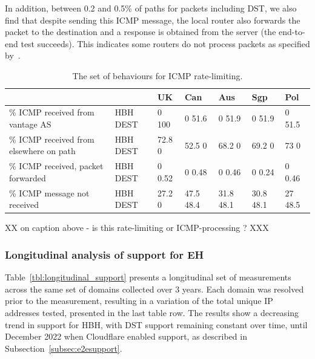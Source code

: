 \documentclass[conference]{IEEEtran}
\begin{document}
In addition, between 0.2 and 0.5\% of paths for packets including DST, we also find that despite sending this ICMP message, the local router also forwards the packet to the destination and a response is  obtained from the server (the end-to-end test succeeds). This indicates some routers do not process packets as specified by~\cite{RFC8200}.

\begin{table}
\begin{tabular}{p{}|p{}|p{}|p{}|p{}|p{}|p{}}

\centering

                                           &             & UK        & Can       & Aus    & Sgp          & Pol     \\
                                           \hline

{\% ICMP received from vantage AS}        & {HBH DEST} & {0 100}  & {0 51.6}    & {0 51.9}    & {0 51.9}    & {0 51.5}  \\
\hline
{\% ICMP received from elsewhere on path}          & {HBH DEST} & {72.8 0} & {52.5 0}    & {68.2 0}    & {69.2 0}    & {73  0}    \\
\hline

{\% ICMP received, packet forwarded}          & {HBH DEST} & {0 0.52} & {0 0.48}    & {0 0.46}    & {0 0.24}    & {0 0.46}  \\
\hline

{\% ICMP message not received} & {HBH DEST} & {27.2 0} & {47.5 48.4} & {31.8 48.1} & {30.8 48.1} & {27 48.5} 
\end{tabular}
\caption{The set of behaviours for ICMP rate-limiting.}
\label{tbl:icmp_support_dst}
\end{table}



XX on caption above - is this rate-limiting or ICMP-processing ? XXX

\subsubsection{Longitudinal analysis of support for EH}

Table~\ref{tbl:longitudinal_support} presents a longitudinal set of measurements across the same set of domains collected over 3 years. Each domain was resolved prior to the measurement, resulting in a variation of the total unique IP addresses tested, presented in the last table row. The results show a decreasing trend in  support for HBH, with DST support remaining constant over time, until December 2022 when Cloudflare enabled support, as described in Subsection~\ref{subsec:e2esupport}.
\end{document}
